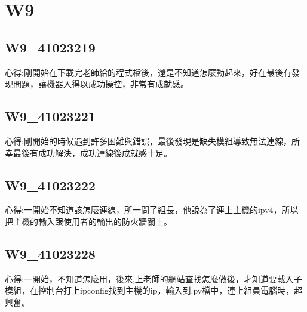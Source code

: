 \chapter{W9}


\section{W9\_41023219}

心得:剛開始在下載完老師給的程式檔後，還是不知道怎麼動起來，好在最後有發現問題，讓機器人得以成功操控，非常有成就感。



\section{W9\_41023221}

心得:剛開始的時候遇到許多困難與錯誤，最後發現是缺失模組導致無法連線，所幸最後有成功解決，成功連線後成就感十足。

\section{W9\_41023222}

心得:一開始不知道該怎麼連線，所一問了組長，他說為了連上主機的ipv4，所以把主機的輸入跟使用者的輸出的防火牆關上。

\section{W9\_41023228}

心得:一開始，不知道怎麼用，後來,上老師的網站查找怎麼做後，才知道要載入子模組，在控制台打上ipconfig找到主機的ip，輸入到.py檔中，連上組員電腦時，超興奮。

